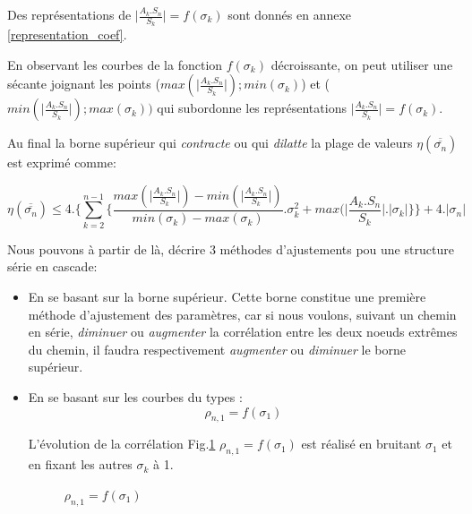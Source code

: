 \documentclass[a4paper]{article}
\begin{document}
\begin{enumerate}
Des représentations de $\vert\frac{A_{k}.S_{n}}{S_{k}} \vert=f(\sigma_{k})$  sont donnés en annexe \ref{representation_coef}. 

En observant les courbes de la fonction $f(\sigma_{k})$ décroissante, on peut utiliser une sécante joignant les points ($max(\vert\frac{A_{k}.S_{n}}{S_{k}} \vert);min(\sigma_{k})$)  et ( $min(\vert\frac{A_{k}.S_{n}}{S_{k}} \vert);max(\sigma_{k}))$ qui subordonne les représentations $\vert\frac{A_{k}.S_{n}}{S_{k}} \vert=f(\sigma_{k})$.

Au final la borne supérieur qui \textit{contracte} ou qui \textit{dilatte} la plage de valeurs $\eta(\overline{\overline{\sigma_{n}}})$ est exprimé comme:

$$\eta(\overline{\overline{\sigma_{n}}})\le4. \{\sum_{k=2}^{n-1} \{\frac{ max(\vert\frac{A_{k}.S_{n}}{S_{k}} \vert)- min(\vert\frac{A_{k}.S_{n}}{S_{k}} \vert)}{min(\sigma_{k})- max(\sigma_{k})}.\sigma_{k}^{2}+ max(\vert\frac{A_{k}.S_{n}}{S_{k}} \vert                     . \vert\sigma_{k}\vert\}\}+4.\vert \sigma_{n} \vert $$

Nous pouvons à partir de là, décrire  3 méthodes d'ajustements pou une structure série en cascade:

\begin{itemize}

\item En se basant sur la borne supérieur.
Cette borne constitue une première méthode d'ajustement des paramètres, car si nous voulons, suivant un chemin en série, \textit{diminuer} ou\textit{ augmenter} la corrélation entre les deux noeuds extrêmes du chemin, il faudra respectivement \textit{augmenter} ou \textit{diminuer} le borne supérieur.


\item En se basant sur les courbes du types :$$\rho_{n,1}=f(\sigma_{1})$$

L'évolution de la corrélation Fig.\ref{corrsigma1} $\rho_{n,1}=f(\sigma_{1})$ est réalisé en bruitant $\sigma_{1}$  et en fixant les autres $\sigma_{k}$ à 1.

\begin{figure}[H]
\centering
{}
\caption{   $\rho_{n,1}=f(\sigma_{1})$ }
\label{corrsigma1}
\end{figure}



\end{itemize}
\end{enumerate}
\end{document}

